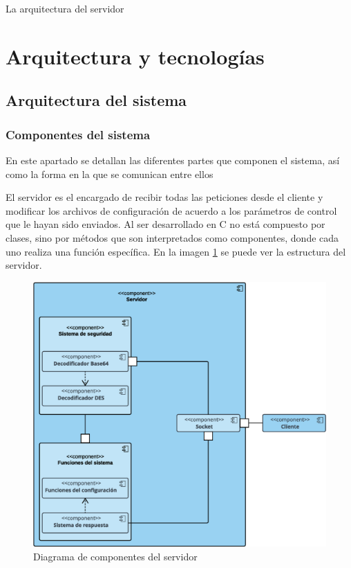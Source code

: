 \documentclass[12pt]{article}
\begin{document}
        La arquitectura del servidor 

\section{Arquitectura y tecnologías}

    \subsection{Arquitectura del sistema}

        \subsubsection{Componentes del sistema}
            En este apartado se detallan las diferentes partes que componen el sistema, así como la forma en la que se comunican entre ellos

            El servidor es el encargado de recibir todas las peticiones desde el cliente y modificar los archivos de configuración de acuerdo a los parámetros de control que le hayan sido enviados. Al ser desarrollado en C no está compuesto por clases, sino por métodos que son interpretados como componentes, donde cada uno realiza una función específica. En la imagen \ref{fig:server_diagram} se puede ver la estructura del servidor.

            \begin{figure}[h!]
            \centering
                \includegraphics[scale=0.4]{server_diagram.eps}
                \caption*{Diagrama de componentes del servidor}
                \label{fig:server_diagram}
            \end{figure}
\end{document}
